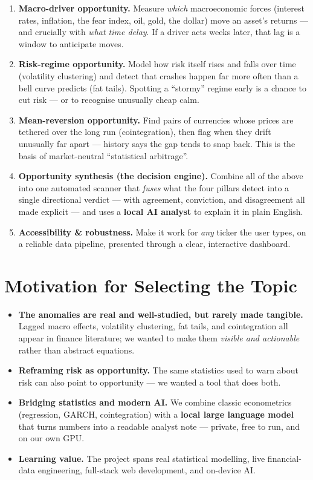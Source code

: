 \documentclass[11pt]{article}
\begin{document}
\begin{enumerate}
\item \textbf{Macro-driver opportunity.} Measure \emph{which} macroeconomic forces
(interest rates, inflation, the fear index, oil, gold, the dollar) move an asset's
returns — and crucially with \emph{what time delay}. If a driver acts weeks later,
that lag is a window to anticipate moves.

\item \textbf{Risk-regime opportunity.} Model how risk itself rises and falls over
time (volatility clustering) and detect that crashes happen far more often than a
bell curve predicts (fat tails). Spotting a ``stormy'' regime early is a chance to
cut risk — or to recognise unusually cheap calm.

\item \textbf{Mean-reversion opportunity.} Find pairs of currencies whose prices are
tethered over the long run (cointegration), then flag when they drift unusually far
apart — history says the gap tends to snap back. This is the basis of
market-neutral ``statistical arbitrage''.

\item \textbf{Opportunity synthesis (the decision engine).} Combine all of the above
into one automated scanner that \emph{fuses} what the four pillars detect into a
single directional verdict — with agreement, conviction, and disagreement all made
explicit — and uses a \textbf{local AI analyst} to explain it in plain English.

\item \textbf{Accessibility \& robustness.} Make it work for \emph{any} ticker the
user types, on a reliable data pipeline, presented through a clear, interactive
dashboard.
\end{enumerate}

\section{Motivation for Selecting the Topic}
\begin{itemize}
\item \textbf{The anomalies are real and well-studied, but rarely made tangible.}
Lagged macro effects, volatility clustering, fat tails, and cointegration all appear
in finance literature; we wanted to make them \emph{visible and actionable} rather
than abstract equations.
\item \textbf{Reframing risk as opportunity.} The same statistics used to warn about
risk can also point to opportunity — we wanted a tool that does both.
\item \textbf{Bridging statistics and modern AI.} We combine classic econometrics
(regression, GARCH, cointegration) with a \textbf{local large language model} that
turns numbers into a readable analyst note — private, free to run, and on our own GPU.
\item \textbf{Learning value.} The project spans real statistical modelling, live
financial-data engineering, full-stack web development, and on-device AI.
\end{itemize}
\end{document}
